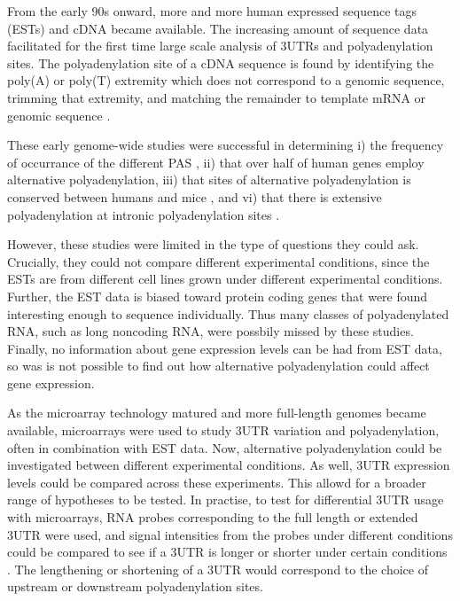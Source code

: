 From the early 90s onward, more and more human expressed sequence tags (ESTs)
and cDNA became available. The increasing amount of sequence data facilitated
for the first time large scale analysis of 3\p UTRs and polyadenylation sites.
The polyadenylation site of a cDNA sequence is found by identifying the poly(A)
or poly(T) extremity which does not correspond to a genomic sequence, trimming
that extremity, and matching the remainder to template mRNA or genomic sequence
\cite{beaudoing_patterns_2000, tian_large-scale_2005}.

These early genome-wide studies were successful in determining i) the frequency
of occurrance of the different PAS \cite{beaudoing_patterns_2000}, ii) that
over half of human genes employ alternative polyadenylation, iii) that sites of
alternative polyadenylation is conserved between humans and mice
\cite{tian_large-scale_2005}, and vi) that there is extensive polyadenylation
at intronic polyadenylation sites \cite{tian_widespread_2007}.

However, these studies were limited in the type of questions they could ask.
Crucially, they could not compare different experimental conditions, since the
ESTs are from different cell lines grown under different experimental
conditions. Further, the EST data is biased toward protein coding genes that
were found interesting enough to sequence individually. Thus many classes of
polyadenylated RNA, such as long noncoding RNA, were possbily missed by these
studies. Finally, no information about gene expression levels can be had from
EST data, so was is not possible to find out how alternative polyadenylation
could affect gene expression.

As the microarray technology matured and more full-length genomes became
available, microarrays were used to study 3\p UTR variation and
polyadenylation, often in combination with EST data. Now, alternative
polyadenylation could be investigated between different experimental
conditions. As well, 3UTR expression levels could be compared across these
experiments. This allowd for a broader range of hypotheses to be tested. In
practise, to test for differential 3UTR usage with microarrays, RNA probes
corresponding to the full length or extended 3UTR were used, and signal
intensities from the probes under different conditions could be compared to see
if a 3UTR is longer or shorter under certain conditions
\cite{sandberg_proliferating_2008, ji_progressive_2009}. The lengthening or
shortening of a 3\p UTR would correspond to the choice of upstream or
downstream polyadenylation sites.

